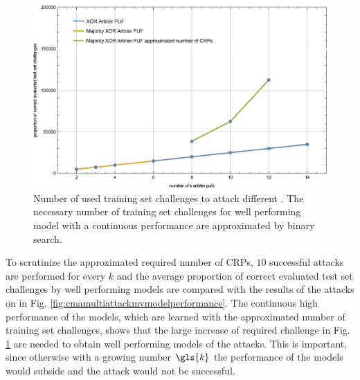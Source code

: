 \begin{figure}[ht]
\includegraphics[width=1.00\textwidth]{images/xor-cma-attack-crps.eps}
\caption[Number of used training set challenges]{Number of used training set challenges to attack different \pufs. The necessary number of training set challenges for well performing model with a continuous performance are approximated by binary search.}
\label{fig:cmamultiattackrequiredcrp}
\end{figure}

To scrutinize the approximated required number of \acp{CRP}, $10$ successful attacks are performed for every $k$ and the average proportion of correct evaluated test set challenges by well performing models are compared with the results of the attacks on \xpufs in Fig. \ref{fig:cmamultiattackmvmodelperformance}.
The continuous high performance of the models, which are learned with the approximated number of training set challenges, shows that the large increase of required challenge in Fig. \ref{fig:cmamultiattackrequiredcrp} are needed to obtain well performing models of the attacks.
This is important, since otherwise with a growing number $\gls{k}$ the performance of the models would subside and the attack would not be successful.

